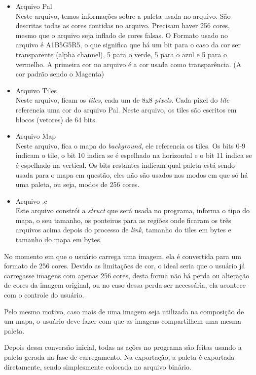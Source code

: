 \documentclass[brazil]{abnt}
\begin{document}
\begin{itemize}
 \item Arquivo Pal\\
 Neste arquivo, temos informações sobre a paleta usada no arquivo. São descritas todas as cores contidas no arquivo. Precisam haver 256 cores, mesmo que o arquivo seja inflado de cores falsas. O Formato usado no arquivo é A1B5G5R5, o que significa que há um bit para o caso da cor ser transparente (alpha channel), 5 para o verde, 5 para o azul e 5 para o vermelho. A primeira cor no arquivo é a cor usada como transparência. (A cor padrão sendo o Magenta)\label{exp:A1B5G5R5}
 \item Arquivo Tiles\\
 Neste arquivo, ficam os \textit{tiles}, cada um de 8x8 \textit{pixels}. Cada pixel do \textit{tile} referencia uma cor do arquivo Pal. Neste arquivo, os tiles são escritos em blocos (vetores) de 64 bits. 
 \item Arquivo Map\\
 Neste arquivo, fica o mapa do \textit{background}, ele referencia os tiles. Os bits 0-9 indicam o tile, o bit 10 indica se é espelhado na horizontal e o bit 11 indica se é espelhado na vertical. Os bits restantes indicam qual paleta está sendo usada para o mapa em questão, eles não são usados nos modos em que só há uma paleta, ou seja, modos de 256 cores.
 \item Arquivo .c\\
 Este arquivo constrói a \textit{struct} que será usada no programa, informa o tipo do mapa, o seu tamanho, os ponteiros para as regiões onde ficaram os três arquivos acima depois do processo de \textit{link}, tamanho do tiles em bytes e tamanho do mapa em bytes. 
\end{itemize}

No momento em que o usuário carrega uma imagem, ela é convertida para um formato de 256 cores. Devido as limitações de cor, o ideal seria que o usuário já carregasse imagens com apenas 256 cores, desta forma não há perda ou alteração de cores da imagem original, ou no caso dessa perda ser necessária, ela acontece com o controle do usuário.

Pelo mesmo motivo, caso mais de uma imagem seja utilizada na composição de um mapa, o usuário deve fazer com que as imagens compartilhem uma mesma paleta.

Depois dessa conversão inicial, todas as ações no programa são feitas usando a paleta gerada na fase de carregamento. Na exportação, a paleta é exportada diretamente, sendo simplesmente colocada no arquivo binário.
\end{document}
